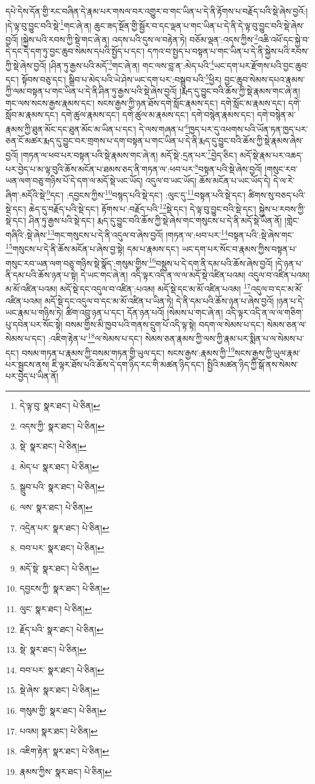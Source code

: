 དཔེ་དེས་དོན་གྱི་རང་བཞིན་དེ་རྣམ་པར་གསལ་བར་འགྱུར་བ་གང་ཡིན་པ་དེ་ནི་རྟོགས་པ་བརྗོད་པའི་སྡེ་ཞེས་བྱའོ:། །དེ་ལྟ་བུ་བྱུང་བའི་སྡེ་\footnote{དེ་ལྟ་བུ་  སྣར་ཐང་།  པེ་ཅིན། }གང་ཞེ་ན། ཆུང་ཟད་སྔོན་གྱི་སྦྱོར་བ་དང་ལྡན་པ་གང་ཡིན་པ་དེ་ནི་དེ་ལྟ་བུ་བྱུང་བའི་སྡེ་ཞེས་བྱའོ། །སྐྱེས་པའི་རབས་ཀྱི་སྡེ་གང་ཞེ་ན། འདས་པའི་དུས་ལ་བརྟེན་ཏེ། བཅོམ་ལྡན་:འདས་ཀྱིས་\footnote{འདས་ཀྱི་  སྣར་ཐང་།  པེ་ཅིན། }འཆི་འཕོ་དང་སྐྱེ་བ་དེ་དང་དེ་དག་ཏུ་བྱང་ཆུབ་སེམས་དཔའི་སྤྱོད་པ་དང་། དཀའ་བ་སྤྱད་པ་བསྟན་པ་གང་ཡིན་པ་དེ་ནི་སྐྱེས་པའི་རབས་ཀྱི་སྡེ་ཞེས་བྱའོ། །ཤིན་ཏུ་རྒྱས་པའི་མདོ་\footnote{སྡེ་  སྣར་ཐང་།  པེ་ཅིན། }གང་ཞེ་ན། གང་ལས་བླ་ན་:མེད་པའི་\footnote{མེད་པ་  སྣར་ཐང་།  པེ་ཅིན། }ཡང་དག་པར་རྫོགས་པའི་བྱང་ཆུབ་དང་། སྟོབས་བཅུ་དང་། སྒྲིབ་པ་མེད་པའི་ཡེ་ཤེས་ཡང་དག་པར་:བསྒྲུབ་པའི་\footnote{སྒྲུབ་པའི་  སྣར་ཐང་།  པེ་ཅིན། }ཕྱིར། བྱང་ཆུབ་སེམས་དཔའ་རྣམས་ཀྱི་ལམ་བསྟན་པ་གང་ཡིན་པ་དེ་ནི་ཤིན་ཏུ་རྒྱས་པའི་སྡེ་ཞེས་བྱའོ། །རྨད་དུ་བྱུང་བའི་ཆོས་ཀྱི་སྡེ་རྣམས་གང་ཞེ་ན། གང་ལས་སངས་རྒྱས་རྣམས་དང་། སངས་རྒྱས་ཀྱི་ཉན་ཐོས་དགེ་སློང་རྣམས་དང་། དགེ་སློང་མ་རྣམས་དང་། དགེ་སློབ་མ་རྣམས་དང་། དགེ་ཚུལ་རྣམས་དང་། དགེ་ཚུལ་མ་རྣམས་དང་། དགེ་བསྙེན་རྣམས་དང་། དགེ་བསྙེན་མ་རྣམས་ཀྱི་ཐུན་མོང་དང་ཐུན་མོང་མ་ཡིན་པ་དང་། དེ་ལས་གཞན་པ་\footnote{ལས་  སྣར་ཐང་།  པེ་ཅིན། }ཁྱད་པར་དུ་འཕགས་པའི་ཡོན་ཏན་ཁྱད་པར་ཅན་ངོ་མཚར་རྨད་དུ་བྱུང་བར་གྲགས་པ་དག་བསྟན་པ་གང་ཡིན་པ་དེ་ནི་རྨད་དུ་བྱུང་བའི་ཆོས་ཀྱི་སྡེ་རྣམས་ཞེས་བྱའོ། །གཏན་ལ་ཕབ་པར་བསྟན་པའི་སྡེ་རྣམས་གང་ཞེ་ན། མདོ་སྡེ་:དྲན་པར་\footnote{འདྲེན་པར་  སྣར་ཐང་།  པེ་ཅིན། }བྱེད་ཅིང་། མདོ་སྡེ་རྣམ་པར་འཆད་པར་བྱེད་པ་མ་ལྟ་བུའི་ཆོས་མངོན་པ་ཐམས་ཅད་ནི་གཏན་ལ་:ཕབ་པར་\footnote{བབ་པར་  སྣར་ཐང་།  པེ་ཅིན། }བསྟན་པའི་སྡེ་ཞེས་བྱའོ། །གསུང་རབ་ཡན་ལག་བཅུ་གཉིས་པོ་དེ་དག་ལ་མདོ་སྡེ་ཡང་ཡོད། འདུལ་བ་ཡང་ཡོད། ཆོས་མངོན་པ་ཡང་ཡོད་དེ། དེ་ལ་རེ་ཞིག་:མདོའི་སྡེ་\footnote{མདོ་སྡེ་  སྣར་ཐང་།  པེ་ཅིན། }དང་། :དབྱངས་ཀྱིས་\footnote{དབྱངས་ཀྱི་  སྣར་ཐང་།  པེ་ཅིན། }བསྙད་པའི་སྡེ་དང་། :ལུང་དུ་\footnote{ལུང་  སྣར་ཐང་།  པེ་ཅིན། }བསྟན་པའི་སྡེ་དང་། ཚིགས་སུ་བཅད་པའི་སྡེ་དང་། ཆེད་དུ་བརྗོད་པའི་སྡེ་དང་། རྟོགས་པ་:བརྗོད་པའི་\footnote{རྗོད་པའི་  སྣར་ཐང་།  པེ་ཅིན། }སྡེ་དང་། དེ་ལྟ་བུ་བྱུང་བའི་སྡེ་དང་། སྐྱེས་པ་རབས་ཀྱི་སྡེ་དང་། ཤིན་ཏུ་རྒྱས་པའི་སྡེ་དང་། རྨད་དུ་བྱུང་བའི་ཆོས་ཀྱི་སྡེ་ཞེས་གང་གསུངས་པ་དེ་ནི་མདོ་སྡེ་ཡིན་ནོ། །གླེང་གཞིའི་:སྡེ་ཞེས་\footnote{སྡེ་  སྣར་ཐང་།  པེ་ཅིན། }གང་གསུངས་པ་དེ་ནི་འདུལ་བ་ཞེས་བྱའོ། །གཏན་ལ་:ཕབ་པར་\footnote{བབ་པར་  སྣར་ཐང་།  པེ་ཅིན། }བསྟན་པའི་:སྡེ་ཞེས་གང་\footnote{སྡེ་ཞེས་  སྣར་ཐང་།  པེ་ཅིན། }གསུངས་པ་དེ་ནི་ཆོས་མངོན་པ་ཞེས་བྱ་སྟེ། དམ་པ་རྣམས་དང་། ཡང་དག་པར་སོང་བ་རྣམས་ཀྱིས་བསྟན་པ་གསུང་རབ་ཡན་ལག་བཅུ་གཉིས་སྡེ་སྣོད་:གསུམ་གྱིས་\footnote{གསུམ་གྱི་  སྣར་ཐང་།  པེ་ཅིན། }བསྡུས་པ་དེ་དག་ནི་དམ་པའི་ཆོས་ཞེས་བྱའོ། །དེ་ཉན་པ་ནི་དམ་པའི་ཆོས་ཉན་པ་སྟེ། དེ་ཡང་གང་ཞེ་ན། འདི་ལྟར་འདི་ན་ལ་ལ་མདོ་སྡེ་འཛིན་པའམ། འདུལ་བ་འཛིན་པའམ། མ་མོ་འཛིན་པའམ། མདོ་སྡེ་དང་འདུལ་བ་འཛིན་:པའམ། མདོ་སྡེ་དང་མ་མོ་འཛིན་པའམ། \footnote{པའམ།    སྣར་ཐང་།  པེ་ཅིན། }འདུལ་བ་དང་མ་མོ་འཛིན་པའམ། མདོ་སྡེ་དང་འདུལ་བ་དང་མ་མོ་འཛིན་པ་ཡིན་ཏེ། དེ་ནི་དམ་པའི་ཆོས་ཉན་པ་ཞེས་བྱའོ། །ཉན་པ་དེ་ཡང་རྣམ་པ་གཉིས་ཏེ། ཚིག་འབྲུ་ཉན་པ་དང་། དོན་ཉན་པའོ། །སེམས་པ་གང་ཞེ་ན། འདི་ལྟར་འདི་ན་ལ་ལ་གཅིག་པུ་དབེན་པར་སོང་སྟེ། བསམ་གྱིས་མི་ཁྱབ་པའི་གནས་དྲུག་པོ་འདི་ལྟ་སྟེ། བདག་ལ་སེམས་པ་དང་། སེམས་ཅན་ལ་སེམས་པ་དང་། :འཇིག་རྟེན་པ་\footnote{འཇིག་རྟེན་  སྣར་ཐང་།  པེ་ཅིན། }ལ་སེམས་པ་དང་། སེམས་ཅན་རྣམས་ཀྱི་ལས་ཀྱི་རྣམ་པར་སྨིན་པ་ལ་སེམས་པ་དང་། བསམ་གཏན་པ་རྣམས་ཀྱི་བསམ་གཏན་གྱི་ཡུལ་དང་། སངས་རྒྱས་:རྣམས་ཀྱི་\footnote{རྣམས་ཀྱིས་  སྣར་ཐང་།  པེ་ཅིན། }སངས་རྒྱས་ཀྱི་ཡུལ་རྣམ་པར་སྦྱངས་ནས། ཇི་ལྟར་ཐོས་པའི་ཆོས་དེ་དག་ཉིད་རང་གི་མཚན་ཉིད་དང་། སྤྱིའི་མཚན་ཉིད་ཀྱི་སྒོ་ནས་སེམས་པར་བྱེད་པ་ཡིན་ནོ། 